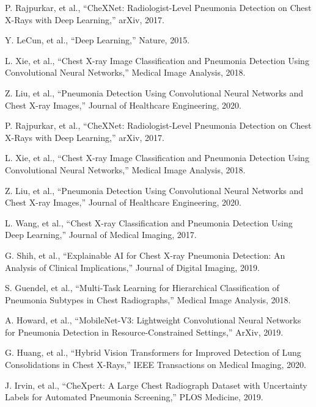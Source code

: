 \documentclass[
  twocolumn,
  10pt,
  a4paper,
  journal
]{IEEEtran}
\begin{document}

\begin{thebibliography}{25}

 P. Rajpurkar, et al., ``CheXNet: Radiologist-Level Pneumonia Detection on Chest X-Rays with Deep Learning,'' arXiv, 2017.

 Y. LeCun, et al., ``Deep Learning,'' Nature, 2015.

 L. Xie, et al., ``Chest X-ray Image Classification and Pneumonia Detection Using Convolutional Neural Networks,'' Medical Image Analysis, 2018.

 Z. Liu, et al., ``Pneumonia Detection Using Convolutional Neural Networks and Chest X-ray Images,'' Journal of Healthcare Engineering, 2020.

 P. Rajpurkar, et al., ``CheXNet: Radiologist-Level Pneumonia Detection on Chest X-Rays with Deep Learning,'' arXiv, 2017.

 L. Xie, et al., ``Chest X-ray Image Classification and Pneumonia Detection Using Convolutional Neural Networks,'' Medical Image Analysis, 2018.

 Z. Liu, et al., ``Pneumonia Detection Using Convolutional Neural Networks and Chest X-ray Images,'' Journal of Healthcare Engineering, 2020.

 L. Wang, et al., ``Chest X-ray Classification and Pneumonia Detection Using Deep Learning,'' Journal of Medical Imaging, 2017.

 G. Shih, et al., ``Explainable AI for Chest X-ray Pneumonia Detection: An Analysis of Clinical Implications,'' Journal of Digital Imaging, 2019.

 S. Guendel, et al., ``Multi-Task Learning for Hierarchical Classification of Pneumonia Subtypes in Chest Radiographs,'' Medical Image Analysis, 2018.

 A. Howard, et al., ``MobileNet-V3: Lightweight Convolutional Neural Networks for Pneumonia Detection in Resource-Constrained Settings,'' ArXiv, 2019.

 G. Huang, et al., ``Hybrid Vision Transformers for Improved Detection of Lung Consolidations in Chest X-Rays,'' IEEE Transactions on Medical Imaging, 2020.

 J. Irvin, et al., ``CheXpert: A Large Chest Radiograph Dataset with Uncertainty Labels for Automated Pneumonia Screening,'' PLOS Medicine, 2019.


\end{thebibliography}
\end{document}
